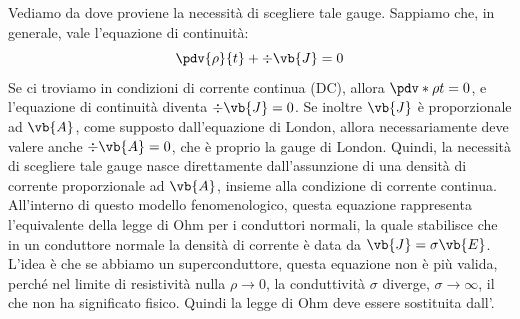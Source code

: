 Vediamo da dove proviene la necessità di scegliere tale gauge. Sappiamo che, in generale, vale l'equazione di continuità:
\begin{equation*}
   \pdv{\rho}{t} + \div{\vb{J}} = 0
\end{equation*}
Se ci troviamo in condizioni di corrente continua (DC), allora $\pdv*{\rho}{t}=0$, e l'equazione di continuità diventa $\div{\vb{J}}=0$. Se inoltre $\vb{J}$ è proporzionale ad $\vb{A}$, come supposto dall'equazione di London, allora necessariamente deve valere anche $\div{\vb{A}}=0$, che è proprio la gauge di London. Quindi, la necessità di scegliere tale gauge nasce direttamente dall'assunzione di una densità di corrente proporzionale ad $\vb{A}$, insieme alla condizione di corrente continua.\\
All'interno di questo modello fenomenologico, questa equazione rappresenta l'equivalente della legge di Ohm per i conduttori normali, la quale stabilisce che in un conduttore normale la densità di corrente è data da $\vb{J}=\sigma \vb{E}$. L'idea è che se abbiamo un superconduttore, questa equazione non è più valida, perché nel limite di resistività nulla $\rho \to 0$, la conduttività $\sigma$ diverge, $\sigma \to \infty$, il che non ha significato fisico. Quindi la legge di Ohm deve essere sostituita dall'.
